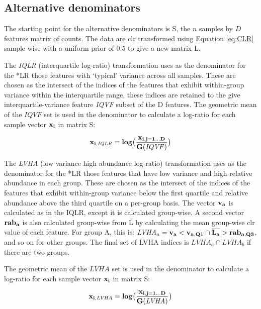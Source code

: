 \documentclass{bmcart}
\begin{document}
\subsection*{Alternative denominators}

The starting point for the alternative denominators is S, the $n$ samples by $D$ features matrix of counts. The data are clr transformed using Equation \ref{eq:CLR} sample-wise with a uniform prior of 0.5 to give a new matrix L. 

The \emph{IQLR} (interquartile log-ratio) transformation uses as the denominator for the *LR those features with `typical' variance across all samples. These are chosen as the intersect of the indices of the features that exhibit within-group variance within the interquartile range, these indices are retained to the give interquartile-variance feature \textit{IQVF} subset of the D features.
The geometric mean of the $\mathit{IQVF}$ set is used in the denominator to calculate a log-ratio for each sample vector $\bf{x}_i$ in matrix S:

\begin{equation}
\bf{x}_{i, \mathit{IQLR}} = log  \big( \frac{\bf{x}_{i,j=1 \dots D}}{G(\mathit{IQVF})}   \big)_{}
\label{eq:iqlr}
\end{equation}

The \emph{LVHA} (low variance high abundance log-ratio) transformation uses as the denominator for the *LR those features that have low variance and high relative abundance in each group. These are chosen as the intersect of the indices of the features that exhibit within-group variance below the first quartile and relative abundance above the third quartile on a per-group basis. The vector $\bf{v}_a$ is calculated as in the IQLR, except it is calculated group-wise. A second vector $\bf{rab}_a$ is also calculated group-wise from L by calculating the mean group-wise clr value of each feature. For group A, this is: $\mathit{LVHA}_a = \bf{v}_a < \bf{v}_{a,Q1} \cap \overline{L_a }> \bf{rab}_{a, Q3}$, and so on for other groups. The final set of LVHA indices is $\mathit{LVHA}_a \cap \mathit{LVHA}_b$ if there are two groups.

The geometric mean of the $\mathit{LVHA}$ set is used in the denominator to calculate a log-ratio for each sample vector $\bf{x}_i$ in matrix S:

\begin{equation}
\bf{x}_{i, \mathit{LVHA}} = log  \big( \frac{\bf{x}_{i,j=1 \dots D}}{G(\mathit{LVHA})}   \big)_{}
\label{eq:vale}
\end{equation}
\end{document}
